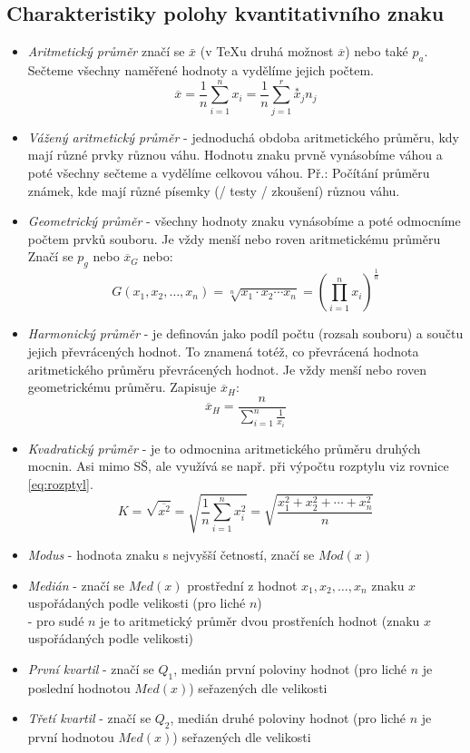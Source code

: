 \documentclass[12pt]{article}
\begin{document}
\subsection{Charakteristiky polohy kvantitativního znaku}
\begin{itemize}
\item \emph{Aritmetický průměr} značí se $\bar{x}$ (v \TeX u druhá možnost  $\overline{x}$) nebo také $p_a$. Sečteme všechny naměřené hodnoty a vydělíme jejich počtem.
\begin{equation}
\overline{x} = \frac{1}{n} \sum^n_{i=1} x_i =  \frac{1}{n} \sum^r_{j=1} \overset{*}{x}_j n_j
\end{equation}
\item \emph{Vážený aritmetický průměr} - jednoduchá obdoba aritmetického průměru, kdy mají různé prvky různou váhu. Hodnotu znaku prvně vynásobíme váhou a poté všechny sečteme a vydělíme celkovou váhou. Př.: Počítání průměru známek, kde mají různé písemky (/ testy / zkoušení) různou váhu.
\item \emph{Geometrický průměr} - všechny hodnoty znaku vynásobíme a poté odmocníme počtem prvků souboru. Je vždy menší nebo roven aritmetickému průměru Značí se $p_g$ nebo $\overline{x}_G$ nebo:
\begin{equation}
G(x_1, x_2, \dotsc,x_n) = \sqrt[n]{x_1 \cdot x_2 \dotsm x_n} = \left( \prod_{i=1}^n x_i \right)^{\frac{1}{n}}
\end{equation}
\item \emph{Harmonický průměr} - je definován jako podíl počtu (rozsah souboru) a součtu jejich převrácených hodnot. To znamená totéž, co převrácená hodnota aritmetického průměru převrácených hodnot. Je vždy menší nebo roven geometrickému průměru. Zapisuje $\overline{x}_H$:
\begin{equation}
\overline{x}_H =  \frac{n}{\sum\limits^n_{i=1} \frac{1}{x_i}}
\end{equation}
\item \emph{Kvadratický průměr} - je to odmocnina aritmetického průměru druhých mocnin. Asi mimo SŠ, ale využívá se např. při výpočtu rozptylu viz rovnice \eqref{eq:rozptyl}.
\begin{equation}
K = \sqrt{\overline{x^2}} = \sqrt{\frac{1}{n} \sum^n_{i=1}x_i^2} = \sqrt{\frac{x_1^2 + x_2^2 + \dotsb + x_n^2}{n}}
\end{equation}
\item \emph{Modus} - hodnota znaku s nejvyšší četností, značí se $Mod(x)$
\item \emph{Medián} - značí se $Med(x)$ prostřední z hodnot $x_1, x_2, \dotsc, x_n$ znaku $x$ uspořádaných podle velikosti (pro liché $n$)\\
 - pro sudé $n$ je to aritmetický průměr dvou prostřeních hodnot (znaku $x$ uspořádaných podle velikosti)
\item \emph{První kvartil} - značí se $Q_1$, medián první poloviny hodnot (pro liché $n$ je poslední hodnotou $Med(x)$) seřazených dle velikosti
\item \emph{Třetí kvartil} - značí se $Q_2$, medián druhé poloviny hodnot (pro liché $n$ je první hodnotou $Med(x)$) seřazených dle velikosti
\end{itemize}
\end{document}
